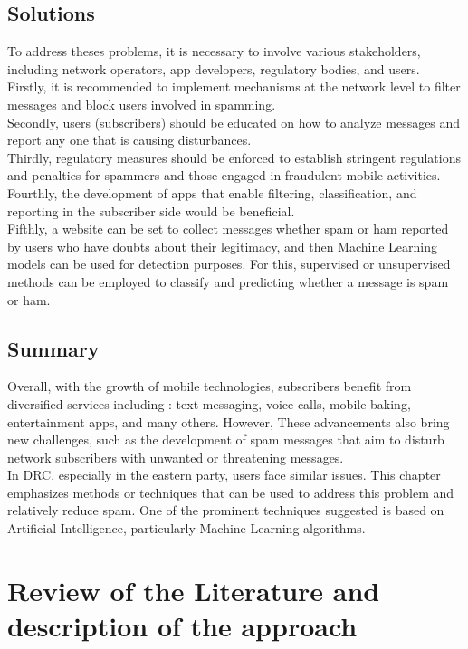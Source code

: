 \documentclass[12pt,a4paper, oneside]{book}
\begin{document}
\section{Solutions}
To address theses problems, it is necessary to involve various stakeholders, including network operators, app developers, regulatory bodies, and users. \\

Firstly, it is recommended to implement mechanisms at the network level \citep{hao2009detecting} to filter messages and block users involved in spamming. \\

Secondly, users (subscribers) should be educated on how to analyze messages and report any one that is causing disturbances. \\

Thirdly, regulatory measures should be enforced to establish stringent regulations and penalties for spammers and those engaged in fraudulent mobile activities. Fourthly, the development of apps that enable filtering, classification, and reporting in the subscriber side would be beneficial.\\

 Fifthly, a website can be set to collect messages whether spam or ham reported by users who have doubts about their legitimacy, and then Machine Learning models can be used for detection purposes. For this, supervised or unsupervised methods can be employed to classify and predicting whether a message is spam or  ham. 
\section{Summary}
Overall, with the growth of mobile technologies, subscribers benefit from diversified services including : text messaging, voice calls, mobile baking, entertainment apps, and many others. However, These advancements also bring new challenges, such as the development of spam messages that aim to disturb network subscribers with unwanted or threatening messages. \\

In DRC, especially in the eastern party, users face similar issues. This chapter emphasizes methods or techniques that can be used to address this problem and relatively reduce spam. One of the prominent techniques suggested is based on Artificial Intelligence, particularly Machine Learning algorithms.
    
    \chapter{Review of the Literature and description of the approach}
\end{document}
